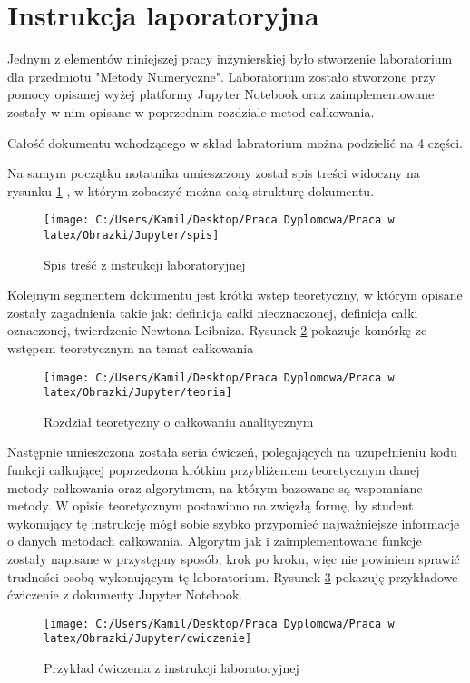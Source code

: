\documentclass[12pt,twoside]{article}
\begin{document}
\section{Instrukcja laporatoryjna}
Jednym z elementów niniejszej pracy inżynierskiej było stworzenie laboratorium dla przedmiotu "Metody Numeryczne".
Laboratorium zostało stworzone przy pomocy opisanej wyżej platformy Jupyter Notebook oraz zaimplementowane zostały w nim opisane w poprzednim rozdziale metod całkowania.

Całość dokumentu wchodzącego w skład labratorium można podzielić na 4 części.

Na samym początku notatnika umieszczony został spis treści widoczny na rysunku \ref{spis} , w którym zobaczyć można całą strukturę dokumentu. 
\begin{figure}[H]
\centering
\texttt{[image: C:/Users/Kamil/Desktop/Praca Dyplomowa/Praca w latex/Obrazki/Jupyter/spis]}
\caption{Spis treść z instrukcji laboratoryjnej}
\label{spis}
\end{figure}

Kolejnym segmentem dokumentu jest krótki wstęp teoretyczny, w którym opisane zostały zagadnienia takie jak: definicja całki nieoznaczonej, definicja całki oznaczonej, twierdzenie Newtona Leibniza.
Rysunek \ref{teoria} pokazuje komórkę ze wstępem teoretycznym na temat całkowania

\begin{figure}[H]
\centering
\texttt{[image: C:/Users/Kamil/Desktop/Praca Dyplomowa/Praca w latex/Obrazki/Jupyter/teoria]}
\caption{Rozdział teoretyczny o całkowaniu analitycznym}
\label{teoria}
\end{figure}

Następnie umieszczona została seria ćwiczeń, polegających na uzupełnieniu kodu funkcji całkującej poprzedzona krótkim przybliżeniem teoretycznym danej metody całkowania oraz algorytmem, na którym bazowane są wspomniane metody.
W opisie teoretycznym postawiono na zwięzłą formę, by student wykonujący tę instrukcję mógł sobie szybko przypomieć najważniejsze informacje o danych metodach całkowania. Algorytm jak i zaimplementowane funkcje zostały napisane w przystępny sposób, krok po kroku, więc nie powiniem sprawić trudności osobą wykonującym tę laboratorium.
Rysunek \ref{cwiczenie} pokazuję przykładowe ćwiczenie z dokumenty Jupyter Notebook.

\begin{figure}[H]
\centering
\texttt{[image: C:/Users/Kamil/Desktop/Praca Dyplomowa/Praca w latex/Obrazki/Jupyter/cwiczenie]}
\caption{Przykład ćwiczenia z instrukcji laboratoryjnej}
\label{cwiczenie}
\end{figure}
\end{document}
